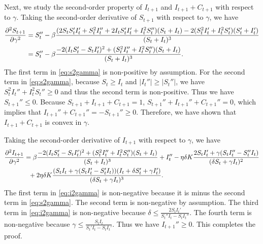 \documentclass[nonblindrev, copyedit]{informs3a}
\newcounter{prop}[chapter]
\begin{document}
Next, we study the second-order property of $I_{t+1}$ and $I_{t+1}+C_{t+1}$ with respect to $\gamma$.
Taking the second-order derivative of $S_{t+1}$ with respect to $\gamma$, we have
\begin{align}
    \frac{\partial^2 S_{t+1}}{\partial \gamma^2}&=S_{t}''-\beta\frac{(2S_{t}S_{t}'I_{t}'+S_{t}^2I_{t}''+2I_{t}S_{t}'I_{t}'+I_{t}^2S_{t}'')(S_{t}+I_{t})-2(S_{t}^2I_{t}'+I_{t}^2S_{t}')(S_{t}'+I_{t}')}{(S_{t}+I_{t})^3}\notag\\
    &=S_{t}''-\beta\frac{-2(I_{t}S_{t}'-S_{t}I_{t}')^2+(S_{t}^2I_{t}''+I_{t}^2S_{t}'')(S_{t}+I_{t})}{(S_{t}+I_{t})^3}.\label{eq:s2gamma}
\end{align}
The first term in \eqref{eq:s2gamma} is non-positive by assumption.
For the second term in \eqref{eq:s2gamma}, because $S_t\ge I_t$ and $|I_{t}''|\ge|S_{t}''|$, we have $S_{t}^2I_{t}''+I_{t}^2S_{t}''\ge0$
and thus the second term is non-positive.
Thus we have $S_{t+1}''\le0$.
Because $S_{t+1}+I_{t+1}+C_{t+1}=1$, $S_{t+1}''+I_{t+1}''+C_{t+1}''=0$, which implies that $I_{t+1}''+C_{t+1}''=-S_{t+1}''\ge0$. Therefore, we have shown that $I_{t+1}+C_{t+1}$ is convex in $\gamma$.

Taking the second-order derivative of $I_{t+1}$ with respect to $\gamma$, we have
\begin{align}
    \frac{\partial^2 I_{t+1}}{\partial \gamma^2}&=\beta\frac{-2(I_{t}S_{t}'-S_{t}I_{t}')^2+(S_{t}^2I_{t}''+I_{t}^2S_{t}'')(S_{t}+I_{t})}{(S_{t}+I_{t})^3}+I_{t}''-\eta\delta K\frac{2S_{t}I_{t}'+\gamma(S_{t}I_{t}''-S_{t}''I_{t})}{(\delta S_{t}+\gamma I_{t})^2}\notag\\
    &\ \ +2\eta\delta K\frac{(S_{t}I_{t}+\gamma(S_{t}I_{t}'-S_{t}'I_{t}))(I_{t}+\delta S_{t}'+\gamma I_{t}')}{(\delta S_{t}+\gamma I_{t})^3}.\label{eq:i2gamma}
\end{align}
The first term in \eqref{eq:i2gamma} is non-negative because it is minus the second term in \eqref{eq:s2gamma}.
The second term is non-negative by assumption.
The third term in \eqref{eq:i2gamma} is non-negative because $\delta\le\frac{2S_{t}I_{t}'}{S_{t}''I_{t}-S_{t}I_{t}''}$.
The fourth term is non-negative because $\gamma\le\frac{S_{t}I_{t}}{S_{t}'I_{t}-S_{t}I_{t}'}$. Thus we have $I_{t+1}''\ge0$.
This completes the proof.\Halmos


\endproof

\end{document}
